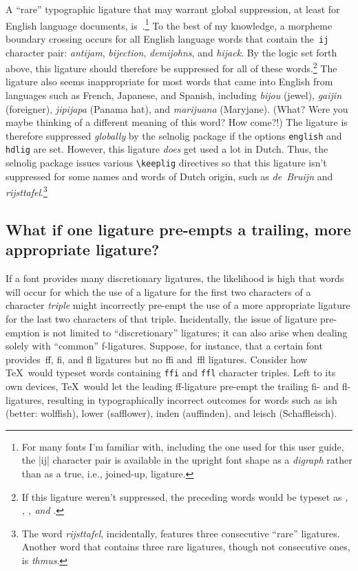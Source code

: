 \documentclass[11pt]{article}
\newcommand{\pkg}[1]{\textsf{#1}}
\newcommand{\opt}[1]{\texttt{#1}}
\newcommand{\cmmd}[1]{\texttt{\textbackslash #1}}
\begin{document}
A \enquote{rare} typographic ligature that may warrant global suppression, at least for English language documents, is~.\footnote{For many fonts I'm familiar with, including the one used for this user guide, the |ij| character pair is available in the upright font shape as a \emph{digraph} rather than as a true, i.e., joined-up, ligature.} To the best of my knowledge, a morpheme boundary crossing occurs for all English language words that contain the~\opt{ij} character pair: \emph{antijam}, \emph{bijection}, \emph{demijohns}, and \emph{hijack}. By the logic set forth above, this ligature should therefore be suppressed for all of these words.\footnote{If this ligature weren't suppressed, the preceding words would be typeset as \emph{, , , \emph{and} }.} The  ligature also seems inappropriate for most words that came into English from languages such as French, Japanese, and Spanish, including \emph{bijou} (jewel), \emph{gaijin} (foreigner), \emph{jipijapa} (Panama hat), and \emph{marijuana} (Maryjane). (What? Were you maybe thinking of a different meaning of this word? How come?!) The  ligature is therefore suppressed \emph{globally} by the \pkg{selnolig} package if the options \opt{english} and \opt{hdlig} are set.
However, this ligature \emph{does} get used a lot in Dutch. Thus, the \pkg{selnolig} package issues various \cmmd{keeplig} directives so that this ligature isn't suppressed for some names and words of Dutch origin, such as \emph{de~Bruijn} and \emph{rijsttafel}.\footnote{The word \emph{rijsttafel}, incidentally, features three consecutive \enquote{rare} ligatures. Another word that contains three rare ligatures, though not consecutive ones, is \emph{thmus}. }



\subsection{What if one ligature pre-empts a trailing, more appropriate ligature?} \label{sec:preempt}

If a font provides many discretionary ligatures, the likelihood is high that words will occur for which the use of a ligature for the first two characters of a character \emph{triple} might incorrectly pre-empt the use of a more appropriate ligature for the last two characters of that triple. Incidentally, the issue of ligature pre-emption is not limited to \enquote{discretionary} ligatures; it can also arise when dealing solely with \enquote{common} f-ligatures. Suppose, for instance, that a certain font provides~ff, fi, and fl ligatures but no ffi and~ffl ligatures. Consider how \TeX\ would typeset words containing \opt{ffi} and \opt{ffl} character triples. Left to its own devices, \TeX\ would let the leading ff-ligature pre-empt the trailing fi- and fl-ligatures, resulting in typographically incorrect outcomes for words such as ish (better: wolffish), lower (safflower), inden (auffinden), and leisch (Schaffleisch). 
\end{document}
